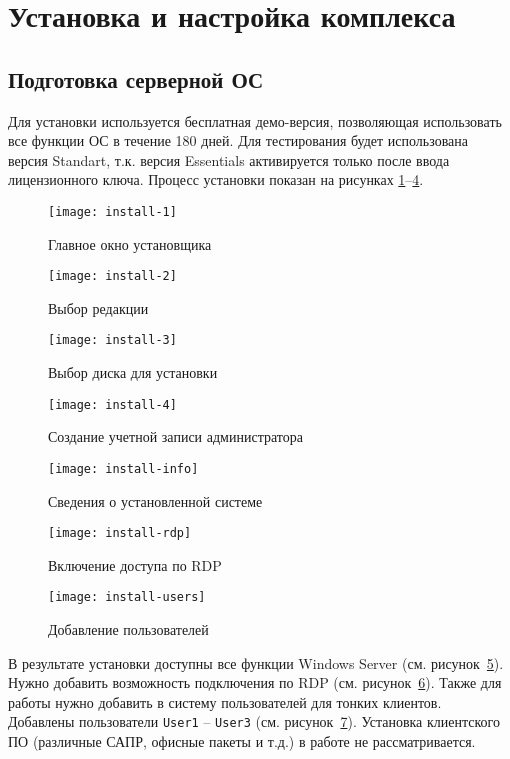 \section{Установка и настройка комплекса}

\subsection{Подготовка серверной ОС}

Для установки используется бесплатная демо-версия, позволяющая использовать все функции
ОС в течение 180 дней. Для тестирования будет использована версия Standart, т.к.
версия Essentials активируется только после ввода лицензионного ключа. Процесс установки
показан на рисунках \ref{pic:install-1}–\ref{pic:install-4}.

\begin{figure}[h]
    \center
    \texttt{[image: install-1]}
    \caption{Главное окно установщика}
    \label{pic:install-1}
\end{figure}

\begin{figure}[p]
    \center
    \texttt{[image: install-2]}
    \caption{Выбор редакции}
    \label{pic:install-2}
\end{figure}

\begin{figure}[p]
    \center
    \texttt{[image: install-3]}
    \caption{Выбор диска для установки}
    \label{pic:install-3}
\end{figure}

\begin{figure}[p]
    \center
    \texttt{[image: install-4]}
    \caption{Создание учетной записи администратора}
    \label{pic:install-4}
\end{figure}

\begin{figure}[p]
    \center
    \texttt{[image: install-info]}
    \caption{Сведения о установленной системе}
    \label{pic:install-info}
\end{figure}

\begin{figure}[p]
    \center
    \texttt{[image: install-rdp]}
    \caption{Включение доступа по RDP}
    \label{pic:install-rdp}
\end{figure}

\begin{figure}[h]
    \center
    \texttt{[image: install-users]}
    \caption{Добавление пользователей}
    \label{pic:install-users}
\end{figure}

В результате установки доступны все функции Windows Server (см.
рисунок~\ref{pic:install-info}). Нужно добавить возможность подключения по RDP
(см. рисунок~\ref{pic:install-rdp}). Также для работы нужно добавить в систему пользователей
для тонких клиентов. Добавлены пользователи \texttt{User1} – \texttt{User3} (см.
рисунок~\ref{pic:install-users}). Установка клиентского ПО (различные САПР, офисные
пакеты и т.д.) в работе не рассматривается.
